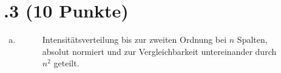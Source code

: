 \section*{\nr.3 \titthree (10 Punkte)}
\begin{enumerate}[(a)]


\item
\begin{figure}[htbp]
\centering

\caption{Intensitätsverteilung bis zur zweiten Ordnung bei $n$ Spalten, absolut normiert und zur Vergleichbarkeit untereinander durch $n^2$ geteilt.}
\label{fig:beugung}
\end{figure}
\end{enumerate}